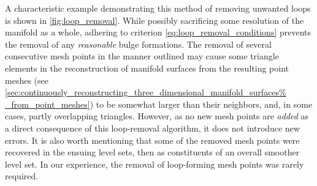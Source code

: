 A characteristic example demonstrating this method of removing unwanted
loops is shown in \cref{fig:loop_removal}. While possibly sacrificing some
resolution of the manifold as a whole, adhering to criterion
\eqref{eq:loop_removal_conditions} prevents the removal of any \emph{reasonable}
bulge formations. The removal of several consecutive mesh
points in the manner outlined may cause some triangle elements in the
reconstruction of manifold surfaces from the resulting point meshes (see
\cref{sec:continuously_reconstructing_three_dimensional_manifold_surfaces%
_from_point_meshes}) to be somewhat larger than their neighbors, and, in some
cases, partly overlapping triangles. However, as no new mesh points are
\emph{added} as a direct consequence of this loop-removal algorithm, it does
not introduce new errors. It is also worth mentioning that some of the removed
mesh points were recovered in the ensuing level sets, then as constituents of
an overall smoother level set. In our experience, the removal of
loop-forming mesh points was rarely required.


